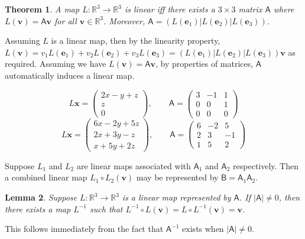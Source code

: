 \documentclass[10pt,notitlepage]{revtex4-1}
\newtheorem{theorem}{Theorem}[section]
\newtheorem{lemma}[theorem]{Lemma}
\newenvironment{proof}[1][Proof]{\begin{trivlist}
\item[\hskip \labelsep {\bfseries #1}]}{\end{trivlist}}
\newenvironment{example}[1][Example]{\begin{trivlist}
\item[\hskip \labelsep {\bfseries #1}]}{\end{trivlist}}
\newcommand{\eb}{\boldsymbol{e}}
\newcommand{\xb}{\boldsymbol{x}}
\newcommand{\vb}{\boldsymbol{v}}
\begin{document}
\begin{theorem}
	A map $L:\mathbb{R}^3\rightarrow\mathbb{R}^3$ is linear iff there exists a
	$3\times3$ matrix $\mathsf{A}$ where $L(\vb)=\mathsf{A}\vb$ for all
	$\vb\in\mathbb{R}^3$. Moreover, $\mathsf{A}=(L(\eb_1)|L(\eb_2)|L(\eb_3))$.
\end{theorem}
\begin{proof}
	Assuming $L$ is a linear map, then by the linearity property, $L(\vb)=v_1
	L(\eb_1)+ v_2 L(\eb_2) + v_3 L(\eb_3) = (L(\eb_1)|L(\eb_2)|L(\eb_3))\vb$ as
	required. Assuming we have $L(\vb)=\mathsf{A}\vb$, by properties of
	matrices, $\mathsf{A}$ automatically induces a linear map.
\end{proof}
\begin{example}
	\begin{equation}
		L\xb=\begin{pmatrix}2x-y+z\\ z\\ 0\end{pmatrix},\qquad
		\mathsf{A}=\begin{pmatrix}3&-1&1\\0&0&1\\0&0&0\end{pmatrix}
	\end{equation}
	\begin{equation}
		L\xb=\begin{pmatrix}6x-2y+5z\\2x+3y-z\\x+5y+2z\end{pmatrix},\qquad
		\mathsf{A}=\begin{pmatrix}6&-2&5\\2&3&-1\\1&5&2\end{pmatrix}
	\end{equation}
\end{example}

Suppose $L_1$ and $L_2$ are linear maps associated with $\mathsf{A}_1$ and
$\mathsf{A}_2$ respectively. Then a combined linear map $L_1\circ L_2(\vb)$ may
be represented by $\mathsf{B}=\mathsf{A}_1 \mathsf{A}_2$.
\begin{lemma}
	Suppose $L:\mathbb{R}^3\rightarrow\mathbb{R}^3$ is a linear map represented
	by $\mathsf{A}$. If $|\mathsf{A}|\neq0$, then there exists a map $L^{-1}$
	such that $L^{-1}\circ L(\vb)=L\circ L^{-1}(\vb)=\vb$.
\end{lemma}
\begin{proof}
	This follows immediately from the fact that $\mathsf{A}^{-1}$ exists when
	$|\mathsf{A}|\neq0$.
\end{proof}
\end{document}
